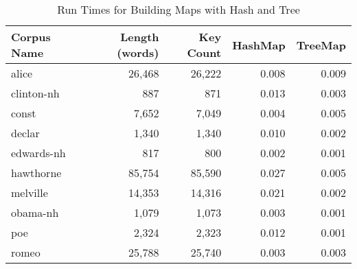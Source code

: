 \documentclass[12pt]{article}
\begin{document}
\begin{table}[h]
\caption{Run Times for Building Maps with Hash and Tree}
\begin{center}
\begin{tabular}{lrrrr}
Corpus Name & Length (words) & Key Count & HashMap &  TreeMap \\
\hline
alice & 26,468 & 26,222 & 0.008  & 0.009 \\
clinton-nh & 887 & 871 & 0.013 & 0.003  \\
const & 7,652 & 7,049 & 0.004 & 0.005 \\ 
declar & 1,340 & 1,340 & 0.010 & 0.002 \\
edwards-nh & 817 & 800 & 0.002 & 0.001 \\ 
hawthorne & 85,754 & 85,590 & 0.027 & 0.005 \\
melville & 14,353 & 14,316 & 0.021 & 0.002 \\
obama-nh & 1,079 & 1,073 & 0.003 & 0.001 \\
poe & 2,324 & 2,323 & 0.012 & 0.001 \\
romeo & 25,788 & 25,740 & 0.003 & 0.003 
\end{tabular}
\end{center}
\end{table}
\end{document}
